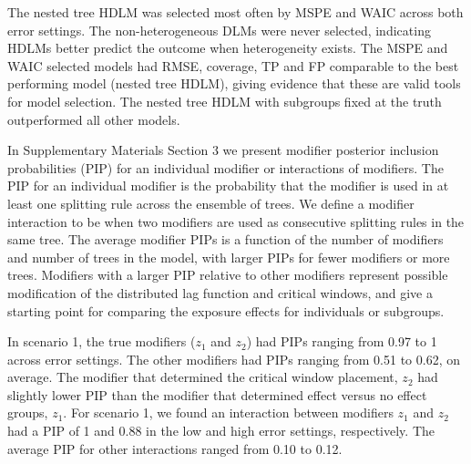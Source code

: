 \documentclass[12pt]{article}
\begin{document}
The nested tree HDLM was selected most often by MSPE and WAIC across both error settings. The non-heterogeneous DLMs were never selected, indicating HDLMs better predict the outcome when heterogeneity exists. The MSPE and WAIC selected models had RMSE, coverage, TP and FP comparable to the best performing model (nested tree HDLM), giving evidence that these are valid tools for model selection. The nested tree HDLM with subgroups fixed at the truth outperformed all other models. %


In Supplementary Materials Section 3 we present modifier posterior inclusion probabilities (PIP) for an individual modifier or interactions of modifiers. The PIP for an individual modifier is the probability that the modifier is used in at least one splitting rule across the ensemble of trees. We define a modifier interaction to be when two modifiers are used as consecutive splitting rules in the same tree. The average modifier PIPs is a function of the number of modifiers and number of trees in the model, with larger PIPs for fewer modifiers or more trees. Modifiers with a larger PIP relative to other modifiers represent possible modification of the distributed lag function and critical windows, and give a starting point for comparing the exposure effects for individuals or subgroups.

In scenario 1, the true modifiers ($z_1$ and $z_2$) had PIPs ranging from 0.97 to 1 across error settings. The other modifiers had PIPs ranging from 0.51 to 0.62, on average. The modifier that determined the critical window placement, $z_2$ had slightly lower PIP than the modifier that determined effect versus no effect groups, $z_1$. For scenario 1, we found an interaction between modifiers $z_1$ and $z_2$ had a PIP of 1 and 0.88 in the low and high error settings, respectively. The average PIP for other interactions ranged from 0.10 to 0.12.
\end{document}
